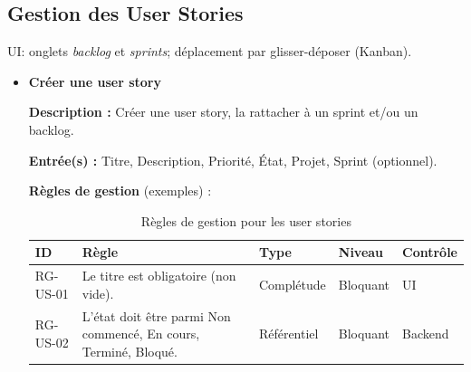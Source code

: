 \subsection{Gestion des User Stories}
UI: onglets \textit{backlog} et \textit{sprints}; déplacement par glisser-déposer (Kanban).
\begin{itemize}
  \item \textbf{Créer une user story}
  
  \textbf{Description :} Créer une user story, la rattacher à un sprint et/ou un backlog.
  
  \textbf{Entrée(s) :} Titre, Description, Priorité, État, Projet, Sprint (optionnel).
  
  \textbf{Règles de gestion} (exemples) :
  \begin{table}[H]
    \centering
    \small
    \begin{tabular}{|l|p{6cm}|l|l|l|}
      \hline
      \textbf{ID} & \textbf{Règle} & \textbf{Type} & \textbf{Niveau} & \textbf{Contrôle} \\
      \hline
      RG-US-01 & Le titre est obligatoire (non vide). & Complétude & Bloquant & UI \\
      \hline
      RG-US-02 & L’état doit être parmi {Non commencé, En cours, Terminé, Bloqué}. & Référentiel & Bloquant & Backend \\
      \hline
    \end{tabular}
    \caption{Règles de gestion pour les user stories}
  \end{table}
\end{itemize}

